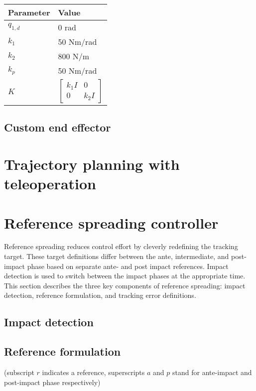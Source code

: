 \documentclass[a4paper, 10pt, conference]{ieeeconf}
\begin{document}
    \begin{table}[h]
    \centering
    \begin{tabular}{l|l}
    \hline
    Parameter & Value                                                \\ \hline
    $q_{1,d}$     & 0 rad                                              \\
    $k_1$     & 50 Nm/rad                                            \\
    $k_2$     & 800 N/m                                              \\
    $k_p$     & 50 Nm/rad                                            \\
    $K$       & $\begin{bmatrix} k_1 I &0 \\ 0 & k_2 I\end{bmatrix}$
    \end{tabular}
    \end{table}


    \subsection{Custom end effector}
    
    \section{Trajectory planning with teleoperation}

    \section{Reference spreading controller}
    Reference spreading reduces control effort by cleverly redefining the tracking target. These target definitions differ between the ante, intermediate, and post-impact phase based on separate ante- and post impact references. Impact detection is used to switch between the impact phases at the appropriate time. This section describes the three key components of reference spreading: impact detection, reference formulation, and tracking error definitions.

    \subsection{Impact detection}

    \subsection{Reference formulation}
    (subscript $r$ indicates a reference, superscripts $a$ and $p$ stand for ante-impact and post-impact phase respectively)
\end{document}
